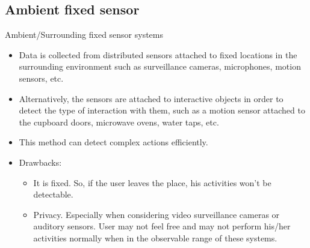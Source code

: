 \documentclass{beamer}
\begin{document}
\subsection{Ambient fixed sensor}
\begin{frame}{Ambient/Surrounding fixed sensor systems}
    \begin{itemize}
        \item Data is collected from distributed sensors attached to fixed locations in the surrounding environment such as surveillance cameras, microphones, motion sensors, etc.
        \item Alternatively, the sensors are attached to interactive objects in order to detect the type of interaction with them, such as a motion sensor attached to the cupboard doors, microwave ovens, water taps, etc.
        \item This method can detect complex actions efficiently.
        \item Drawbacks:
        \begin{itemize}
            \item It is fixed. So, if the user leaves the place, his activities won’t be detectable.
            \item Privacy. Especially when considering video surveillance cameras or auditory sensors. User may not feel free and may not perform his/her activities normally when in the observable range of these systems.
        \end{itemize}
    \end{itemize}
\end{frame}
\end{document}
